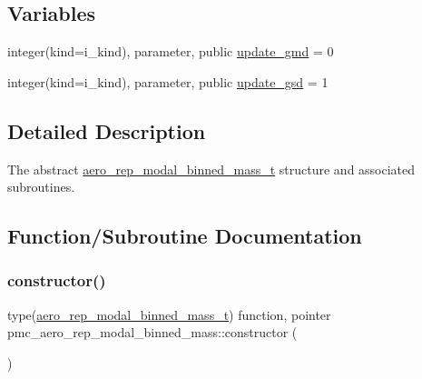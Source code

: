 \subsection*{Variables}
\begin{DoxyCompactItemize}
\item 
integer(kind=i\+\_\+kind), parameter, public \mbox{\hyperlink{namespacepmc__aero__rep__modal__binned__mass_a3e392f3475d58d74c9502c6548ef0c57}{update\+\_\+gmd}} = 0
\item 
integer(kind=i\+\_\+kind), parameter, public \mbox{\hyperlink{namespacepmc__aero__rep__modal__binned__mass_af36cf9b1476e17900c5534892f166736}{update\+\_\+gsd}} = 1
\end{DoxyCompactItemize}


\subsection{Detailed Description}
The abstract \mbox{\hyperlink{structpmc__aero__rep__modal__binned__mass_1_1aero__rep__modal__binned__mass__t}{aero\+\_\+rep\+\_\+modal\+\_\+binned\+\_\+mass\+\_\+t}} structure and associated subroutines. 

\subsection{Function/\+Subroutine Documentation}
\mbox{\label{namespacepmc__aero__rep__modal__binned__mass_a45a135fa387108e2a7ac3664186f3a09}} 
\subsubsection{\texorpdfstring{constructor()}{constructor()}}
{\footnotesize\ttfamily type(\mbox{\hyperlink{structpmc__aero__rep__modal__binned__mass_1_1aero__rep__modal__binned__mass__t}{aero\+\_\+rep\+\_\+modal\+\_\+binned\+\_\+mass\+\_\+t}}) function, pointer pmc\+\_\+aero\+\_\+rep\+\_\+modal\+\_\+binned\+\_\+mass\+::constructor (\begin{DoxyParamCaption}{ }\end{DoxyParamCaption})\hspace{0.3cm}{\ttfamily [private]}}



